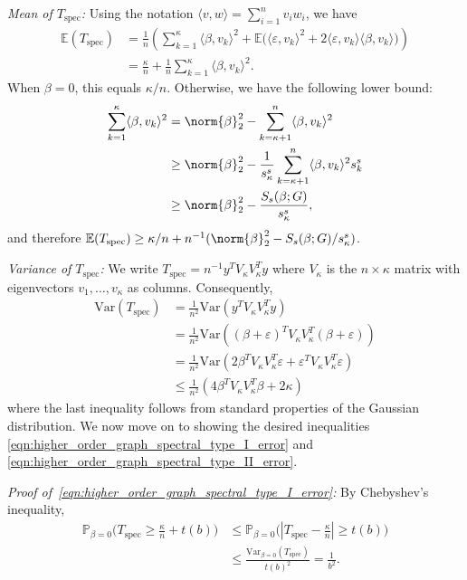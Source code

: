 \documentclass{article}
\newcommand{\abs}[1]{\left \lvert #1 \right \rvert}
\newcommand{\Var}{\mathrm{Var}}
\newcommand{\1}{\mathbf{1}}
\newcommand{\Pbb}{\mathbb{P}}
\newcommand{\Ebb}{\mathbb{E}}
\newcommand{\dotp}[2]{\langle #1, #2 \rangle}
\newcommand{\spec}{\mathrm{spec}}
\theoremstyle{alden}
\theoremstyle{aldenthm}
\theoremstyle{definition}
\theoremstyle{remark}
\begin{document}
\textit{Mean of $T_{\mathrm{spec}}$:} Using the notation $\dotp{v}{w} = \sum_{i = 1}^{n} v_iw_i$, we have
\begin{align*}
\Ebb(T_{\spec}) & = \frac{1}{n}\left(\sum_{k = 1}^{\kappa} \dotp{\beta}{v_k}^2 + \Ebb\bigl( \dotp{\varepsilon}{v_k}^2 + 2 \dotp{\varepsilon}{v_k} \dotp{\beta}{v_k}\bigr)\right) \\
& = \frac{\kappa}{n} + \frac{1}{n}\sum_{k = 1}^{\kappa}\dotp{\beta}{v_k}^2.
\end{align*}
When $\beta = 0$, this equals $\kappa/n$. Otherwise, we have the following lower bound:
\begin{align*}
\sum_{k = 1}^{\kappa}\dotp{\beta}{v_k}^2 & = \norm{\beta}_2^2 - \sum_{k = \kappa + 1}^{n} \dotp{\beta}{v_k}^2 \\
& \geq \norm{\beta}_2^2 - \frac{1}{s_{\kappa}^s}\sum_{k = \kappa + 1}^{n} \dotp{\beta}{v_k}^2 s_k^s \\
& \geq \norm{\beta}_2^2 - \frac{S_s(\beta;G)}{s_{\kappa}^s},
\end{align*}
and therefore $\Ebb(T_{\spec}) \geq \kappa/n + n^{-1}(\norm{\beta}_2^2 - S_s(\beta;G)/s_{\kappa}^s)$. 

\vspace{.2 in}

\textit{Variance of $T_{\mathrm{spec}}$:}
We write $T_{\mathrm{spec}} = n^{-1} y^T V_{\kappa} V_{\kappa}^T y$ where $V_{\kappa}$ is the $n \times \kappa$ matrix with eigenvectors $v_1,\ldots,v_{\kappa}$ as columns. Consequently,
\begin{align}
\Var(T_{\spec}) & = \frac{1}{n^2} \Var(y^T V_{\kappa} V_{\kappa}^T y) \\
& = \frac{1}{n^2} \Var((\beta + \varepsilon)^T V_{\kappa} V_{\kappa}^T (\beta + \varepsilon)) \\
& = \frac{1}{n^2} \Var(2 \beta^T V_{\kappa} V_{\kappa}^T \varepsilon + \varepsilon^T V_{\kappa} V_{\kappa}^T \varepsilon) \\
& \leq \frac{1}{n^2}(4 \beta^T V_{\kappa} V_{\kappa}^T \beta + 2\kappa)
\end{align}
where the last inequality follows from standard properties of the Gaussian distribution. We now move on to showing the desired inequalities \eqref{eqn:higher_order_graph_spectral_type_I_error} and \eqref{eqn:higher_order_graph_spectral_type_II_error}.

\vspace{.2 in}

\textit{Proof of~\eqref{eqn:higher_order_graph_spectral_type_I_error}:} By Chebyshev's inequality,
\begin{align*}
\Pbb_{\beta = 0}\bigl(T_{\spec} \geq \frac{\kappa}{n} + t(b)\bigr)
& \leq \Pbb_{\beta = 0}\bigl(\abs{T_{\spec} - \frac{\kappa}{n}} \geq t(b)\bigr) \\
& \leq \frac{\Var_{\beta = 0}(T_{\spec})}{t(b)^2} = \frac{1}{b^2}.
\end{align*}
\end{document}
